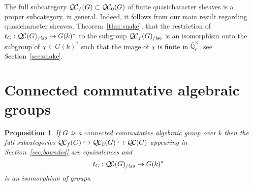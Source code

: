 \documentclass[11pt]{amsart}
\theoremstyle{plain}
\newtheorem{proposition}[theorem]{Proposition}
\theoremstyle{definition}
\theoremstyle{remark}
\newcommand{\EE}{\mathbb{\bar Q}_\ell}
\newcommand{\Fq}{k}
\newcommand{\EEx}{\EE^\times}
\newcommand{\QC}{{\mathcal{Q\hskip-0.8pt C}}}
\newcommand{\QCb}{{\QC_0}}
\newcommand{\QCf}{{\QC_f}}
\newcommand{\QCiso}[1]{\QC(#1)_{/\textit{iso}}}
\newcommand{\QCfiso}[1]{\QCf(#1)_{/\text{iso}}}
\newcommand{\trFrob}[1]{t_{#1}}
\begin{document}
The full subcategory $\QCf(G) \subset \QCb(G)$ of finite quasicharacter sheaves is a proper subcategory, in general. Indeed, it follows from our main result regarding quasicharacter sheaves, Theorem~\ref{thm:snake}, that the restriction of $\trFrob{G} : \QCiso{G} \to G(\Fq)^*$ to the subgroup $\QCfiso{G}$ is an isomorphism onto the subgroup of $\chi \in G(\Fq)^*$ such that the image of $\chi$ is finite in $\EEx$; see Section~\ref{sec:snake}.
 
\section{Connected commutative algebraic groups} \label{sec:connected}

%

\begin{proposition}\label{prop:connected}
  If $G$ is a connected commutative algebraic group over $\Fq$ then 
  the full subcategories $\QCf(G) \hookrightarrow \QCb(G) \hookrightarrow \QC(G)$ 
  appearing in Section~\ref{sec:bounded} are equivalences 
  and
  \[
  \trFrob{G} : \QCiso{G} \to G(\Fq)^*
  \]
  is an isomorphism of groups.
\end{proposition}
\end{document}
